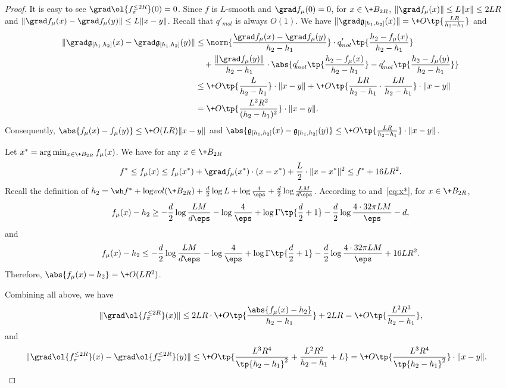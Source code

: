 \begin{proof}
        It is easy to see $\grad \ol{f^{\le 2R}_\pi}(0)=0$. Since $f$ is $L$-smooth and $\grad f_\mu(0)=0$, for $x\in \+B_{2R}$, $\|\grad f_\mu(x) \| \leq L\|x\| \leq 2LR$ and $\|\grad f_\mu(x) - \grad f_\mu(y) \|\leq L\|x-y\|$. Recall that $q'_{\!{mol}}$ is always $O(1)$. We have $\|\grad \mathfrak{g}_{[h_1,h_2]}(x)\| =\+O\tp{\frac{LR}{h_2-h_1}}$ and 
        \begin{align*}
            \|\grad \mathfrak{g}_{[h_1,h_2]}(x) - \grad \mathfrak{g}_{[h_1,h_2]}(y) \| &\leq \norm{\frac{\grad f_\mu(x)-\grad f_\mu(y)}{h_2-h_1}}\cdot q_{\!{mol}}'\tp{\frac{ h_2 - f_\mu(x) }{ h_2 - h_1 }} \\
            &\quad + \frac{\|\grad f_{\mu}(y)\|}{h_2-h_1} \cdot \abs{q_{\!{mol}}'\tp{\frac{ h_2 - f_\mu(x) }{ h_2 - h_1 }} - q_{\!{mol}}'\tp{\frac{ h_2 - f_\mu(y) }{ h_2 - h_1 }}}\\
            &\leq \+O\tp{\frac{L}{h_2-h_1}}\cdot \|x-y\| + \+O\tp{\frac{LR}{h_2-h_1}\cdot \frac{LR}{h_2-h_1}}\cdot \|x-y\|\\
            &= \+O\tp{\frac{L^2R^2}{(h_2-h_1)^2}}\cdot \|x-y\|.
        \end{align*}
        Consequently, $\abs{f_\mu(x)-f_\mu(y)} \leq \+O(LR)\|x-y\|$ and $\abs{ \mathfrak{g}_{[h_1,h_2]}(x) - \mathfrak{g}_{[h_1,h_2]}(y) } \leq \+O\tp{\frac{LR}{h_2-h_1}}\cdot \|x-y\|$.
        
         Let $x^* = \arg\min_{x\in \+B_{2R}} f_\mu(x)$. We have for any $x\in \+B_{2R}$
         \begin{equation}\label{eq:x*}
             f^*\leq f_\mu(x) \leq f_\mu(x^*) + \grad f_\mu(x^*)\cdot (x-x^*) + \frac{L}{2}\cdot \|x-x^*\|^2 \leq f^* + 16LR^2. 
         \end{equation}
        Recall the definition of $h_2 =  \wh f^* + \log \!{vol}(\+B_{2R}) + \frac{d}{2}\log L + \log \frac{4}{\eps} + \frac{d}{2}\log\frac{LM}{d\eps}$. According to  and~\eqref{eq:x*}, for $x\in \+B_{2R}$, 
        \[
             f_\mu(x)-h_2\geq - \frac{d}{2}\log \frac{LM}{d\eps} - \log\frac{4}{\eps} + \log\Gamma\tp{\frac{d}{2}+1} - \frac{d}{2}\log \frac{4\cdot 32\pi LM}{\eps} - d,
        \]
        and
        \[
             f_\mu(x)-h_2\leq - \frac{d}{2}\log \frac{LM}{d\eps} - \log\frac{4}{\eps} + \log\Gamma\tp{\frac{d}{2}+1} - \frac{d}{2}\log \frac{4\cdot 32\pi LM}{\eps} + 16LR^2.
        \]    
        Therefore, $\abs{f_\mu(x)-h_2}= \+O(LR^2)$.

        Combining all above, we have
        \[
             \| \grad \ol{f^{\le 2R}_\pi}(x) \| \leq 2LR \cdot \+O\tp{\frac{\abs{f_\mu(x)-h_2}}{h_2-h_1}}  + 2LR = \+O\tp{\frac{L^2R^3}{h_2-h_1}},
        \]
        and 
        \begin{align*}
            \|\grad \ol{f^{\le 2R}_\pi}(x) - \grad \ol{f^{\le 2R}_\pi}(y)\| &\leq \+O\tp{\frac{L^3R^4}{\tp{h_2-h_1}^2} + \frac{L^2R^2}{h_2-h_1} + L } = \+O\tp{\frac{L^3R^4}{\tp{h_2-h_1}^2}}\cdot \|x-y\|.
        \end{align*}
\end{proof}
